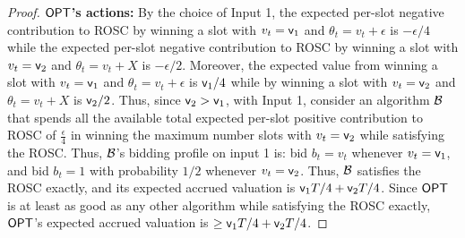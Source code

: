 \begin{proof}
{\bf $\mathsf{OPT}$'s actions:} By the choice of Input 1, the expected per-slot negative contribution to ROSC by winning a slot with $v_t={\mathsf{v}}_1$ and $\theta_t=v_t+\epsilon$ is $-\epsilon/4$ while the expected per-slot negative contribution to ROSC by winning a slot with $v_t={\mathsf{v}}_2$ and $\theta_t=v_t+X$ is $-\epsilon/2$. 
Moreover, the expected value from winning a slot with $v_t={\mathsf{v}}_1$ and $\theta_t=v_t+\epsilon$ is ${\mathsf{v}}_1/4$ while by winning a slot with $v_t={\mathsf{v}}_2$ and $\theta_t=v_t+X$ is ${\mathsf{v}}_2/2$.
Thus, since ${\mathsf{v}}_2>{\mathsf{v}}_1$, with Input 1, consider an algorithm $\mathcal{B}$ that spends all the available 
total expected per-slot positive contribution to ROSC of $\frac{\epsilon}{4}$ in winning the maximum number slots with $v_t={\mathsf{v}}_2$ while satisfying the ROSC. Thus, $\mathcal{B}$'s bidding profile on input 1 is:  bid $b_t=v_t$ whenever $v_t={\mathsf{v}}_1$, and bid $b_t=1$ with probability $1/2$ whenever $v_t={\mathsf{v}}_2$. 
Thus, $\mathcal{B}$ satisfies the ROSC exactly, and its expected accrued valuation is ${\mathsf{v}}_1T/4+{\mathsf{v}}_2 T/4$. Since $\mathsf{OPT}$ is at least as good as any other algorithm while satisfying the ROSC exactly, $\mathsf{OPT}$'s expected accrued valuation is $\ge {\mathsf{v}}_1T/4+{\mathsf{v}}_2 T/4$.



\end{proof}
